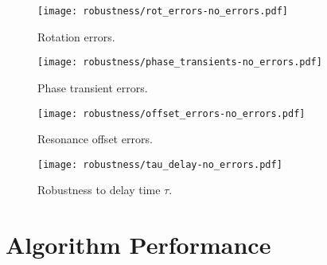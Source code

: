 
\begin{figure}[H]
    \centering
    \texttt{[image: robustness/rot\_errors-no\_errors.pdf]}
    \caption{Rotation errors. %
    }
    \label{fig:rot_errors-no_errors}
\end{figure}

\begin{figure}[H]
    \centering
    \texttt{[image: robustness/phase\_transients-no\_errors.pdf]}
    \caption{Phase transient errors. %
    }
    \label{fig:phase_transients-no_errors}
\end{figure}

\begin{figure}[H]
    \centering
    \texttt{[image: robustness/offset\_errors-no\_errors.pdf]}
    \caption{Resonance offset errors. %
    }
    \label{fig:offset_errors-no_errors}
\end{figure}

\begin{figure}[H]
    \centering
    \texttt{[image: robustness/tau\_delay-no\_errors.pdf]}
    \caption{Robustness to delay time $\tau$. %
    }
    \label{fig:tau_delay-no_errors}
\end{figure}











\lipsum[1-2]

\section{Algorithm Performance}


